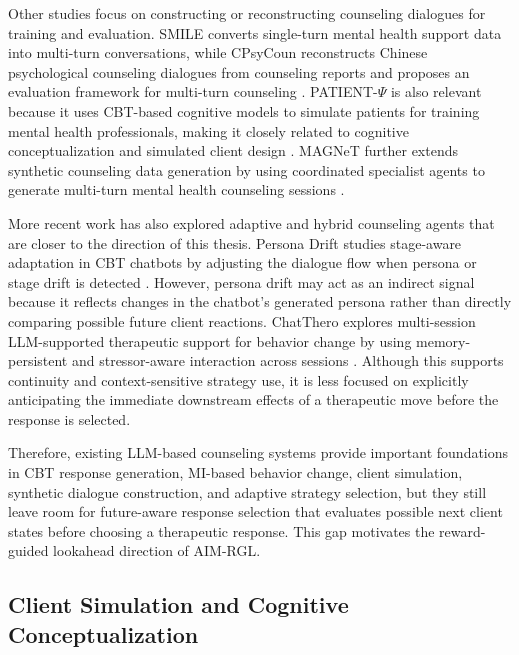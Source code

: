 Other studies focus on constructing or reconstructing counseling dialogues for training and evaluation. SMILE converts single-turn mental health support data into multi-turn conversations, while CPsyCoun reconstructs Chinese psychological counseling dialogues from counseling reports and proposes an evaluation framework for multi-turn counseling \cite{qiu2024smile,zhang2024cpsycoun}. PATIENT-\(\Psi\) is also relevant because it uses CBT-based cognitive models to simulate patients for training mental health professionals, making it closely related to cognitive conceptualization and simulated client design \cite{wang2024patientpsi}. MAGNeT further extends synthetic counseling data generation by using coordinated specialist agents to generate multi-turn mental health counseling sessions \cite{mandal2025magnet}.

More recent work has also explored adaptive and hybrid counseling agents that are closer to the direction of this thesis. Persona Drift studies stage-aware adaptation in CBT chatbots by adjusting the dialogue flow when persona or stage drift is detected \cite{yun2025personadrift}. However, persona drift may act as an indirect signal because it reflects changes in the chatbot's generated persona rather than directly comparing possible future client reactions. ChatThero explores multi-session LLM-supported therapeutic support for behavior change by using memory-persistent and stressor-aware interaction across sessions \cite{wang2025chatthero}. Although this supports continuity and context-sensitive strategy use, it is less focused on explicitly anticipating the immediate downstream effects of a therapeutic move before the response is selected.

Therefore, existing LLM-based counseling systems provide important foundations in CBT response generation, MI-based behavior change, client simulation, synthetic dialogue construction, and adaptive strategy selection, but they still leave room for future-aware response selection that evaluates possible next client states before choosing a therapeutic response. This gap motivates the reward-guided lookahead direction of AIM-RGL.

\subsection{Client Simulation and Cognitive Conceptualization}

